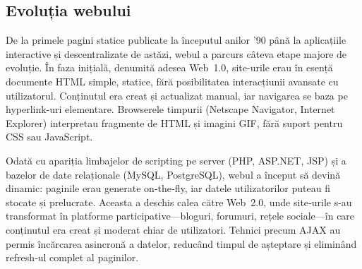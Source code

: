 \documentclass[titlepage,12pt]{article}
\begin{document}
\begin{table}[htb]
    \centering
    \caption{Date tehnice și comparaţie între modele}
\end{table}

\subsection{Evoluția webului}

De la primele pagini statice publicate la începutul anilor ’90 până la aplicațiile interactive și descentralizate de astăzi, webul a parcurs câteva etape majore de evoluție. În faza inițială, denumită adesea Web 1.0, site-urile erau în esență documente HTML simple, statice, fără posibilitatea interacțiunii avansate cu utilizatorul. Conținutul era creat și actualizat manual, iar navigarea se baza pe hyperlink-uri elementare. Browserele timpurii (Netscape Navigator, Internet Explorer) interpretau fragmente de HTML și imagini GIF, fără suport pentru CSS sau JavaScript.

Odată cu apariția limbajelor de scripting pe server (PHP, ASP.NET, JSP) și a bazelor de date relaționale (MySQL, PostgreSQL), webul a început să devină dinamic: paginile erau generate on‑the‑fly, iar datele utilizatorilor puteau fi stocate și prelucrate. Aceasta a deschis calea către Web 2.0, unde site‑urile s-au transformat în platforme participative—bloguri, forumuri, rețele sociale—în care conținutul era creat și moderat chiar de utilizatori. Tehnici precum AJAX au permis încărcarea asincronă a datelor, reducând timpul de așteptare și eliminând refresh‑ul complet al paginilor.
\end{document}
